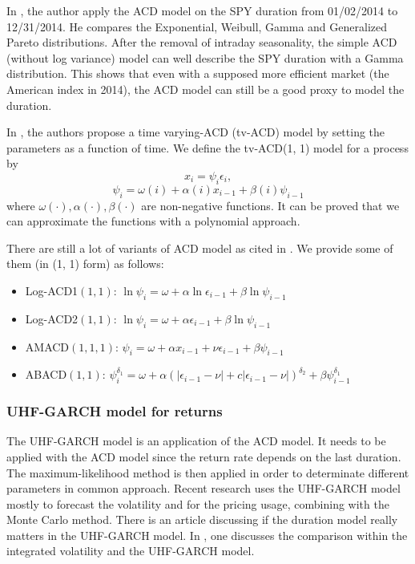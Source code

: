 \documentclass[12pt, a4paper]{article}
\begin{document}
In \cite{acd_NYSE}, the author apply the ACD model on the SPY duration from 01/02/2014 to 12/31/2014. He compares the Exponential, Weibull, Gamma and Generalized Pareto distributions. After the removal of intraday seasonality, the simple ACD (without log variance) model can well describe the SPY duration with a Gamma distribution. This shows that even with a supposed more efficient market (the American index in 2014), the ACD model can still be a good proxy to model the duration.

In \cite{nonstationary_acd}, the authors propose a time varying-ACD (tv-ACD) model by setting the parameters as a function of time. We define the tv-ACD(1, 1) model for a process by
$$
x_i = \psi_i\epsilon_i,
$$
$$
\psi_i = \omega(i) + \alpha(i)x_{i-1} + \beta(i)\psi_{i-1}
$$
where $\omega(\cdot), \alpha(\cdot), \beta(\cdot)$ are non-negative functions. It can be proved that we can approximate the functions with a polynomial approach.

There are still a lot of variants of ACD model as cited in \cite{nonstationary_acd}. We provide some of them (in (1, 1) form) as follows:
\begin{itemize}
    \item Log-ACD1$(1,1)$: $\ln \psi_i = \omega + \alpha \ln \epsilon_{i-1} + \beta \ln \psi_{i-1} $
    \item Log-ACD2$(1,1)$: $\ln \psi_i = \omega + \alpha \epsilon_{i-1} + \beta \ln \psi_{i-1} $
    \item AMACD$(1,1,1)$: $\psi_i = \omega + \alpha x_{i-1} + \nu \epsilon_{i-1} + \beta \psi_{i-1} $
    \item ABACD$(1,1)$: $\psi_i^{\delta_1} = \omega + \alpha(|\epsilon_{i-1} - \nu| + c|\epsilon_{i-1} - \nu|)^{\delta_2} + \beta \psi_{i-1}^{\delta_1}$
\end{itemize}

\subsubsection{UHF-GARCH model for returns}
The UHF-GARCH model is an application of the ACD model. It needs to be applied with the ACD model since the return rate depends on the last duration. The maximum-likelihood method is then applied in order to determinate different parameters in common approach. Recent research uses the UHF-GARCH model mostly to forecast the volatility and for the pricing usage, combining with the Monte Carlo method. There is an article \cite{forecasting} discussing if the duration model really matters in the UHF-GARCH model. In \cite{vol}, one discusses the comparison within the integrated volatility and the UHF-GARCH model.
\end{document}
